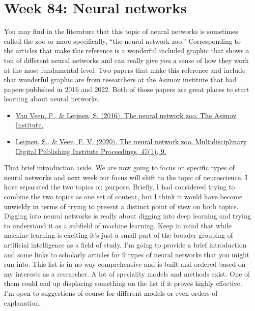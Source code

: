 \documentclass{article}
\begin{document}
\section{Week 84: Neural networks}
You may find in the literature that this topic of neural networks is sometimes called the zoo or more specifically, “the neural network zoo.” Corresponding to the articles that make this reference is a wonderful included graphic that shows a ton of different neural networks and can really give you a sense of how they work at the most fundamental level. Two papers that make this reference and include that wonderful graphic are from researchers at the Asimov institute that had papers published in 2016 and 2022. Both of those papers are great places to start learning about neural networks. 

\begin{itemize}
\item \href{https://www.asimovinstitute.org/neural-network-zoo/}{Van Veen, F., \& Leijnen, S. (2016). The neural network zoo. The Asimov Institute.} \cite{van2016neural}
\item \href{https://www.mdpi.com/2504-3900/47/1/9}{Leijnen, S., \& Veen, F. V. (2020). The neural network zoo. Multidisciplinary Digital Publishing Institute Proceedings, 47(1), 9.} \cite{leijnen2020neural}
\end{itemize}

That brief introduction aside. We are now going to focus on specific types of neural networks and next week our focus will shift to the topic of neuroscience. I have separated the two topics on purpose. Briefly, I had considered trying to combine the two topics as one set of content, but I think it would have become unwieldy in terms of trying to present a distinct point of view on both topics. Digging into neural networks is really about digging into deep learning and trying to understand it as a subfield of machine learning. Keep in mind that while machine learning is exciting it's just a small part of the broader grouping of artificial intelligence as a field of study. I’m going to provide a brief introduction and some links to scholarly articles for 9 types of neural networks that you might run into. This list is in no way comprehensive and is built and ordered based on my interests as a researcher. A lot of speciality models and methods exist. One of them could end up displacing something on the list if it proves highly effective. I’m open to suggestions of course for different models or even orders of explanation.
\end{document}
